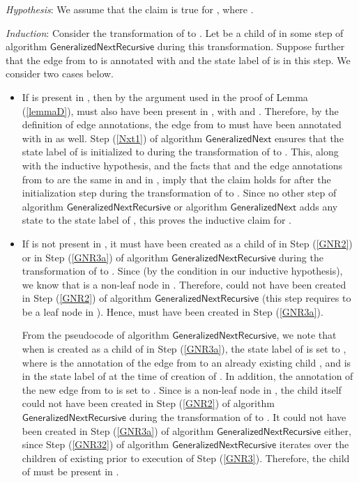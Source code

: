 \documentclass[3p]{elsarticle}
\newcommand{\algo}[1]{\ensuremath{\textsf{{#1}}}}
\begin{document}
\begin{enumerate}
    \noindent \emph{Hypothesis}: We assume that the claim is true
    for , where .

    \noindent \emph{Induction}: Consider the transformation of
     to .  Let  be a child of  in some step
    of algorithm \algo{GeneralizedNextRecursive} during this
    transformation.  Suppose further that the edge from  to  is
    annotated with  and the state label of  is  in
    this step.  We consider two cases below.
    \begin{itemize}
    \item If  is present in , then by the argument used
      in the proof of Lemma (\ref{lemmaD}),  must also have been
      present in , with  and
      .  Therefore, by the definition of
      edge annotations, the edge from  to  must have been
      annotated with  in  as well.  Step (\ref{Nxt1}) of
      algorithm \algo{GeneralizedNext} ensures that the state label of
       is initialized to 
      during the transformation of  to .  This,
      along with the inductive hypothesis, and the facts that
       and the edge annotations from  to
       are the same in  and in , imply that the
      claim holds for  after the initialization step during the
      transformation of  to .  Since no other step
      of algorithm \algo{GeneralizedNextRecursive} or algorithm
      \algo{GeneralizedNext} adds any state to the state label of
      , this proves the inductive claim for .

    \item If  is not present in , it must have been
      created as a child of  in Step (\ref{GNR2}) or in Step
      (\ref{GNR3a}) of algorithm \algo{GeneralizedNextRecursive}
      during the transformation of  to .  Since  (by the condition in our inductive hypothesis), we know
      that  is a non-leaf node in .  Therefore,  could
      not have been created in Step (\ref{GNR2}) of algorithm
      \algo{GeneralizedNextRecursive} (this step requires  to be a
      leaf node in ).  Hence,  must have been created
      in Step (\ref{GNR3a}).

      From the pseudocode of algorithm
      \algo{GeneralizedNextRecursive}, we note that when  is
      created as a child of  in Step (\ref{GNR3a}), the state label
      of  is set to , where  is the annotation
      of the edge from  to an already existing child , and
       is in the state label of  at the time of creation
      of .  In addition, the annotation of the new edge from 
      to  is set to .  Since  is a non-leaf node in ,
      the child  itself could not have been created in Step
      (\ref{GNR2}) of algorithm \algo{GeneralizedNextRecursive} during
      the transformation of  to .  It could not have
      been created in Step (\ref{GNR3a}) of algorithm
      \algo{GeneralizedNextRecursive} either, since Step (\ref{GNR32})
      of algorithm \algo{GeneralizedNextRecursive} iterates over the
      children of  existing prior to execution of Step
      (\ref{GNR3}).  Therefore, the child  of  must be present
      in .


\end{itemize}
\end{enumerate}
\end{document}
